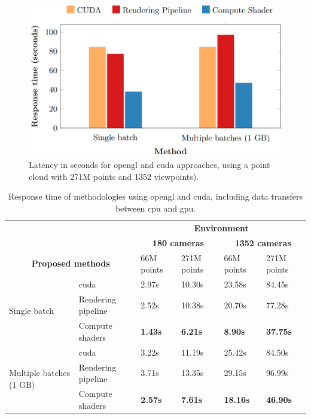 \begin{figure}[ht]
    \includegraphics[width=.8\linewidth]{figs/multi_thermal_projection/results/response_time_cuda_opengl.png}
    \caption{Latency in seconds for \acrshort{opengl} and \acrshort{cuda} approaches, using a point cloud with 271M points and 1352 viewpoints).}
    \label{fig:cuda_opengl_occlusion_response_time}
\end{figure}

\renewcommand{\arraystretch}{1.2}
\begin{table}[htb]
\centering
\caption{Response time of methodologies using \acrshort{opengl} and \acrshort{cuda}, including data transfers between \acrshort{cpu} and \acrshort{gpu}.}
\label{table:cuda_opengl_occlusion_response_time}
\begin{tabular}{llllll}
    \toprule
    \multicolumn{2}{c}{} & \multicolumn{4}{c}{\textbf{Environment}} \\
    \cmidrule{3-6}
    \multicolumn{2}{c}{} & \multicolumn{2}{c}{\textbf{180 cameras}} & \multicolumn{2}{c}{\textbf{1352 cameras}}\\
    \cmidrule{3-6}
    \multicolumn{2}{c}{\textbf{Proposed methods}} & 66M points & 271M points & 66M points & 271M points\\
    \midrule
    \multirow{3}{*}{Single batch} & \acrshort{cuda} & 2.97s & 10.30s & 23.58s & 84.45s\\
    & Rendering pipeline & 2.52s & 10.38s & 20.70s & 77.28s\\
    & Compute shaders & \textbf{1.43s} & \textbf{6.21s} & \textbf{8.90s} & \textbf{37.75s}\\
    \hline
    \multirow{3}{*}{Multiple batches (1 GB)} & \acrshort{cuda} & 3.22s & 11.19s & 25.42s & 84.50s\\
    & Rendering pipeline & 3.71s & 13.35s & 29.15s & 96.99s\\
    & Compute shaders & \textbf{2.57s} & \textbf{7.61s} & \textbf{18.16s} & \textbf{46.90s}\\
    \bottomrule
\end{tabular}
\end{table}
\renewcommand{\arraystretch}{1}

